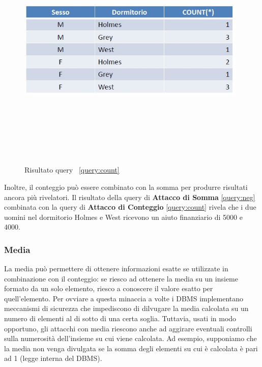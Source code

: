 \begin{figure}[htpb]
	\centering
		{\includegraphics[height=11cm, width=11cm, keepaspectratio]{Immagini/dati_sensibili/prot_dati_08.JPG}}
							\caption{Risultato query ~\ref{query:count} \label{fig:query_indiretta_result1}}                           
\end{figure}

Inoltre, il conteggio può essere combinato con la somma per produrre risultati ancora più rivelatori. Il risultato della query di \textbf{Attacco di Somma} \ref{query:neg} combinata con la query di \textbf{Attacco di Conteggio} \ref{query:count} rivela che i due uomini nel dormitorio Holmes e West ricevono un aiuto finanziario di 5000 e 4000.

\subsubsection{Media}

La media può permettere di ottenere informazioni esatte se utilizzate in combinazione con il conteggio: se riesco ad ottenere la media su un insieme formato da un solo elemento, riesco a conoscere il valore esatto per quell'elemento. Per ovviare a questa minaccia a volte i DBMS implementano meccanismi di sicurezza che impediscono di dilvugare la media calcolata su un numero di elementi al di sotto di una certa soglia. Tuttavia, usati in modo opportuno, gli attacchi con media riescono anche ad aggirare eventuali controlli sulla numerosità dell'insieme su cui viene calcolata. Ad esempio, supponiamo che la media non venga divulgata se la somma degli elementi su cui è calcolata è pari ad 1 (legge interna del DBMS). 

